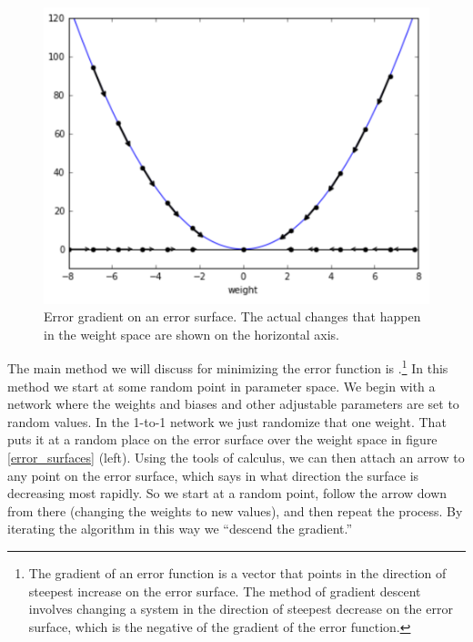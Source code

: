 \begin{figure}[h]
\centering
\includegraphics[scale=.5]{./images/GradientDescent.png}
\caption[Jeff Yoshimi.]{Error gradient on an error surface. The actual changes that happen in the weight space are shown on the horizontal axis.}
\label{gradient_descent}
\end{figure}

The main method we will discuss for minimizing the error function is  .\footnote{The gradient of an error function is a vector that points in the direction of steepest increase on the error surface. The method of gradient descent involves changing a system in the direction of steepest decrease on the error surface, which is the negative of the gradient of the error function.}  In this method we start at some random point in parameter space. We begin with a network where the weights and biases and other adjustable parameters are set to random values. In the 1-to-1 network we just randomize that one weight. That puts it at a random place on the error surface over the weight space in figure \ref{error_surfaces} (left). Using the tools of calculus, we can then attach an arrow to any point on the error surface, which says in what direction the surface is decreasing most rapidly. So we start at a random point, follow the arrow down from there (changing the weights to new values), and then repeat the process. By iterating the algorithm in this way we ``descend the gradient.''

